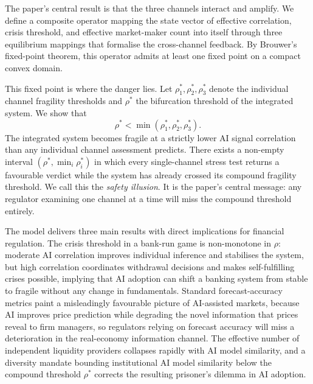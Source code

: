 The paper's central result is that the three channels interact and amplify. We define a composite operator mapping the state vector of effective correlation, crisis threshold, and effective market-maker count into itself through three equilibrium mappings that formalise the cross-channel feedback. By Brouwer's fixed-point theorem, this operator admits at least one fixed point on a compact convex domain.

This fixed point is where the danger lies. Let $\rho_1^*, \rho_2^*, \rho_3^*$ denote the individual channel fragility thresholds and $\rho^*$ the bifurcation threshold of the integrated system. We show that
\begin{equation}\label{eq:main-result-intro}
  \rho^* < \min(\rho_1^*, \rho_2^*, \rho_3^*).
\end{equation}
The integrated system becomes fragile at a strictly lower AI signal correlation than any individual channel assessment predicts. There exists a non-empty interval $(\rho^*, \min_i \rho_i^*)$ in which every single-channel stress test returns a favourable verdict while the system has already crossed its compound fragility threshold. We call this the \emph{safety illusion}. It is the paper's central message: any regulator examining one channel at a time will miss the compound threshold entirely.

The model delivers three main results with direct implications for financial regulation. The crisis threshold in a bank-run game is non-monotone in $\rho$: moderate AI correlation improves individual inference and stabilises the system, but high correlation coordinates withdrawal decisions and makes self-fulfilling crises possible, implying that AI adoption can shift a banking system from stable to fragile without any change in fundamentals. Standard forecast-accuracy metrics paint a misleadingly favourable picture of AI-assisted markets, because AI improves price prediction while degrading the novel information that prices reveal to firm managers, so regulators relying on forecast accuracy will miss a deterioration in the real-economy information channel. The effective number of independent liquidity providers collapses rapidly with AI model similarity, and a diversity mandate bounding institutional AI model similarity below the compound threshold $\rho^*$ corrects the resulting prisoner's dilemma in AI adoption.

